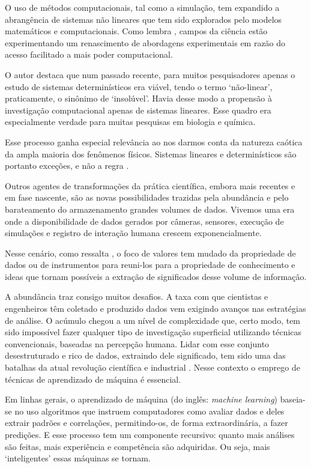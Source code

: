 O uso de métodos computacionais, tal como a simulação, tem expandido a abrangência de sistemas não lineares que tem sido explorados pelo modelos matemáticos e computacionais. Como lembra , campos da ciência estão experimentando um renascimento de abordagens experimentais em razão do acesso facilitado a mais poder computacional. 

O autor destaca que num passado recente, para muitos pesquisadores apenas o estudo de sistemas determinísticos era viável, tendo o termo `não-linear', praticamente, o sinônimo de `insolúvel'. Havia desse modo a propensão à investigação computacional apenas de sistemas lineares. Esse quadro era especialmente verdade para muitas pesquisas em biologia e química. 

Esse processo ganha especial relevância ao nos darmos conta da natureza caótica da ampla maioria dos fenômenos físicos. Sistemas lineares e determinísticos são portanto exceções, e não a regra \cite[]{Weintrop2016}.

Outros agentes de transformações da prática científica, embora mais recentes e em fase nascente, são as novas possibilidades trazidas pela abundância e pelo barateamento do armazenamento grandes volumes de dados. Vivemos uma era onde a disponibilidade de dados gerados por câmeras, sensores, execução de simulações e registro de interação humana crescem exponencialmente. 

Nesse cenário, como ressalta , o foco de valores tem mudado da propriedade de dados ou de instrumentos para reuni-los para a propriedade de conhecimento e ideas que tornam possíveis a extração de significados desse volume de informação. 

A abundância traz consigo muitos desafios. A taxa com que cientistas e engenheiros têm coletado e produzido dados vem exigindo avanços nas estratégias de análise. O acúmulo chegou a um nível de complexidade que, certo modo, tem sido impossível fazer qualquer tipo de investigação superficial utilizando técnicas convencionais, baseadas na percepção humana. Lidar com esse conjunto desestruturado e rico de dados, extraindo dele significado, tem sido uma das batalhas da atual revolução científica e industrial \cite[]{Djorgovski2005}. Nesse contexto o emprego de técnicas de aprendizado de máquina é essencial.

Em linhas gerais, o aprendizado de máquina (do inglês: \textit{machine learning}) baseia-se no uso algoritmos que instruem computadores como avaliar dados e deles extrair padrões e correlações, permitindo-os, de forma extraordinária, a fazer predições. E esse processo tem um componente recursivo: quanto mais análises são feitas, mais experiência e competência são adquiridas. Ou seja, mais `inteligentes' essas máquinas se tornam.

